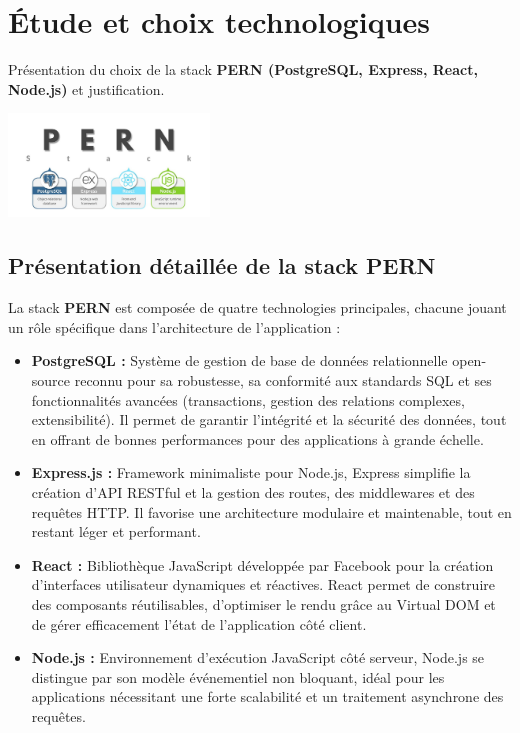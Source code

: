\documentclass[12pt,a4paper]{report}
\begin{document}
\chapter{Étude et choix technologiques}

Présentation du choix de la stack \textbf{PERN (PostgreSQL, Express, React, Node.js)} et justification.  

\begin{center}
    \includegraphics[width=0.4\textwidth]{1_ptqverAyBpdfUDhrs2g_3A.jpg} %
\end{center}

\section*{Présentation détaillée de la stack PERN}

La stack \textbf{PERN} est composée de quatre technologies principales, chacune jouant un rôle spécifique dans l’architecture de l’application :

\begin{itemize}
    \item \textbf{PostgreSQL :} Système de gestion de base de données relationnelle open-source reconnu pour sa robustesse, sa conformité aux standards SQL et ses fonctionnalités avancées (transactions, gestion des relations complexes, extensibilité). Il permet de garantir l’intégrité et la sécurité des données, tout en offrant de bonnes performances pour des applications à grande échelle.
    \item \textbf{Express.js :} Framework minimaliste pour Node.js, Express simplifie la création d’API RESTful et la gestion des routes, des middlewares et des requêtes HTTP. Il favorise une architecture modulaire et maintenable, tout en restant léger et performant.
    \item \textbf{React :} Bibliothèque JavaScript développée par Facebook pour la création d’interfaces utilisateur dynamiques et réactives. React permet de construire des composants réutilisables, d’optimiser le rendu grâce au Virtual DOM et de gérer efficacement l’état de l’application côté client.
    \item \textbf{Node.js :} Environnement d’exécution JavaScript côté serveur, Node.js se distingue par son modèle événementiel non bloquant, idéal pour les applications nécessitant une forte scalabilité et un traitement asynchrone des requêtes.
\end{itemize}
\end{document}
